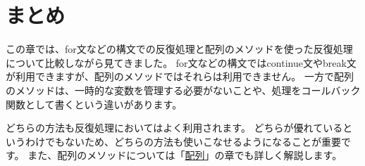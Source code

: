 \hypertarget{conclusion}{%
\section{まとめ}\label{conclusion}}

この章では、for文などの構文での反復処理と配列のメソッドを使った反復処理について比較しながら見てきました。
for文などの構文ではcontinue文やbreak文が利用できますが、配列のメソッドではそれらは利用できません。
一方で配列のメソッドは、一時的な変数を管理する必要がないことや、処理をコールバック関数として書くという違いがあります。

どちらの方法も反復処理においてはよく利用されます。
どちらが優れているというわけでもないため、どちらの方法も使いこなせるようになることが重要です。
また、配列のメソッドについては「\hyperlink{array}{配列}」の章でも詳しく解説します。
